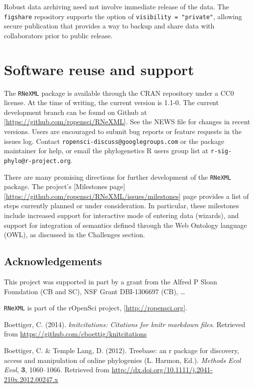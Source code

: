 \documentclass[author-year, review, 11pt]{components/elsarticle} %
\begin{document}
Robust data archiving need not involve immediate release of the data.
The \texttt{figshare} repository supports the option of
\texttt{visibility = "private"}, allowing secure publication that
provides a way to backup and share data with collaborators prior to
public release.

\section{Software reuse and support}\label{software-reuse-and-support}

The \texttt{RNeXML} package is available through the CRAN repository
under a CC0 license. At the time of writing, the current version is
1.1-0. The current development branch can be found on Github at
{[}\url{https://github.com/ropensci/RNeXML}{]}. See the NEWS file for
changes in recent versions. Users are encouraged to submit bug reports
or feature requests in the issues log. Contact
\texttt{ropensci-discuss@googlegroups.com} or the package maintainer for
help, or email the phylogenetics R users group list at
\texttt{r-sig-phylo@r-project.org}.

There are many promising directions for further development of the
\texttt{RNeXML} package. The project's {[}Milestones
page{]}{[}\url{https://github.com/ropensci/RNeXML/issues/milestones}{]}
page provides a list of steps currently planned or under consideration.
In particular, these milestones include increased support for
interactive mode of entering data (wizards), and support for integration
of semantics defined through the Web Ontology language (OWL), as
discussed in the Challenges section.

\subsection{Acknowledgements}\label{acknowledgements}

This project was supported in part by a grant from the Alfred P Sloan
Foundation (CB and SC), NSF Grant DBI-1306697 (CB), \ldots{}

\texttt{RNeXML} is part of the rOpenSci project,
{[}\url{http://ropensci.org}{]}.

Boettiger, C. (2014). \emph{knitcitations: Citations for knitr markdown
files}. Retrieved from \url{https://github.com/cboettig/knitcitations}

Boettiger, C. \& {Temple Lang}, D. (2012). Treebase: an r package for
discovery, access and manipulation of online phylogenies (L. Harmon,
Ed.). \emph{Methods Ecol Evol}, \textbf{3}, 1060--1066. Retrieved from
\url{http://dx.doi.org/10.1111/j.2041-210x.2012.00247.x}
\end{document}
